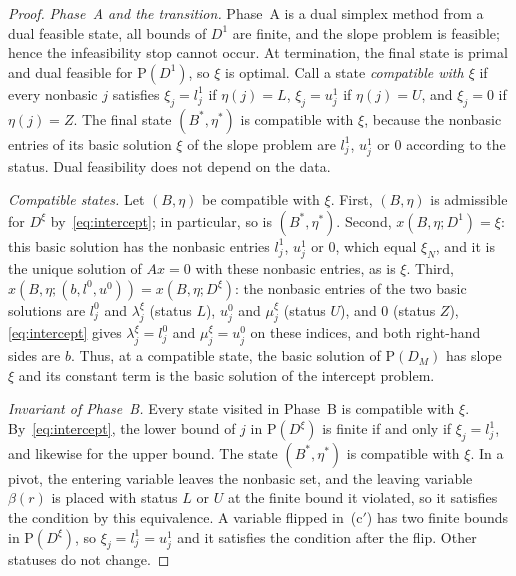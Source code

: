 \documentclass[11pt,a4paper]{article}
\theoremstyle{plain}
\theoremstyle{definition}
\theoremstyle{remark}
\newcommand{\Pb}{\mathrm{P}}
\begin{document}
\begin{proof}
\emph{Phase~A and the transition.} Phase~A is a dual simplex method from a dual feasible state, all bounds of $D^1$ are finite, and the slope problem is feasible; hence the infeasibility stop cannot occur. At termination, the final state is primal and dual feasible for $\Pb(D^1)$, so $\xi$ is optimal. Call a state \emph{compatible with $\xi$} if every nonbasic $j$ satisfies $\xi_j=l^1_j$ if $\eta(j)=L$, $\xi_j=u^1_j$ if $\eta(j)=U$, and $\xi_j=0$ if $\eta(j)=Z$. The final state $(B^\ast,\eta^\ast)$ is compatible with $\xi$, because the nonbasic entries of its basic solution $\xi$ of the slope problem are $l^1_j$, $u^1_j$ or $0$ according to the status. Dual feasibility does not depend on the data.

\emph{Compatible states.} Let $(B,\eta)$ be compatible with $\xi$. First, $(B,\eta)$ is admissible for $D^\xi$ by~\eqref{eq:intercept}; in particular, so is $(B^\ast,\eta^\ast)$. Second, $x(B,\eta;D^1)=\xi$: this basic solution has the nonbasic entries $l^1_j$, $u^1_j$ or $0$, which equal $\xi_N$, and it is the unique solution of $Ax=0$ with these nonbasic entries, as is $\xi$. Third, $x(B,\eta;(b,l^0,u^0))=x(B,\eta;D^\xi)$: the nonbasic entries of the two basic solutions are $l^0_j$ and $\lambda^\xi_j$ (status $L$), $u^0_j$ and $\mu^\xi_j$ (status $U$), and $0$ (status $Z$), \eqref{eq:intercept} gives $\lambda^\xi_j=l^0_j$ and $\mu^\xi_j=u^0_j$ on these indices, and both right-hand sides are $b$. Thus, at a compatible state, the basic solution of $\Pb(D_M)$ has slope $\xi$ and its constant term is the basic solution of the intercept problem.

\emph{Invariant of Phase~B.} Every state visited in Phase~B is compatible with $\xi$. By~\eqref{eq:intercept}, the lower bound of $j$ in $\Pb(D^\xi)$ is finite if and only if $\xi_j=l^1_j$, and likewise for the upper bound. The state $(B^\ast,\eta^\ast)$ is compatible with $\xi$. In a pivot, the entering variable leaves the nonbasic set, and the leaving variable $\beta(r)$ is placed with status $L$ or $U$ at the finite bound it violated, so it satisfies the condition by this equivalence. A variable flipped in~(c$'$) has two finite bounds in $\Pb(D^\xi)$, so $\xi_j=l^1_j=u^1_j$ and it satisfies the condition after the flip. Other statuses do not change.


\end{proof}
\end{document}
